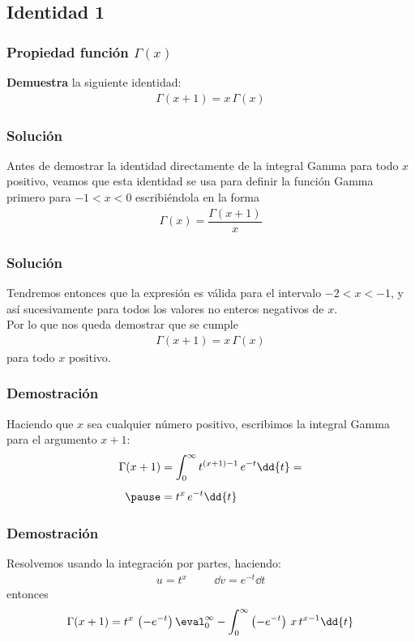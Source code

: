 \subsection{Identidad 1}
\begin{frame}
\frametitle{Propiedad función $\Gamma(x)$}
\textbf{Demuestra} la siguiente identidad:
\begin{align*}
\Gamma (x + 1) = x \, \Gamma (x)
\end{align*}
\end{frame}
\begin{frame}
\frametitle{Solución}
Antes de demostrar la identidad directamente de la integral Gamma para todo $x$ positivo, veamos que esta identidad se usa para definir la función Gamma primero para $-1 < x < 0$ escribiéndola en la forma 
\begin{align*}
\Gamma(x) = \dfrac{\Gamma (x + 1)}{x}
\end{align*}
\end{frame}
\begin{frame}
\frametitle{Solución}
Tendremos entonces que la expresión es válida para el intervalo $-2 < x < -1$, y así sucesivamente para todos los valores no enteros negativos de $x$.
\\
\bigskip
\pause
Por lo que nos queda demostrar que se cumple
\begin{align*}
\Gamma (x + 1) =  x \, \Gamma (x)
\end{align*}
para todo $x$ positivo.
\end{frame}
\begin{frame}
\frametitle{Demostración}
Haciendo que $x$ sea cualquier número positivo, escribimos la integral Gamma para el argumento $x + 1$:
\begin{eqnarray*}
\Gamma (x + 1) &= \displaystyle \int_{0}^{\infty} t^{(x+1)-1} \, e^{-t} \dd{t} = \\[0.5em] \pause
&= t^{x} \, e^{-t} \dd{t}
\end{eqnarray*}
\end{frame}
\begin{frame}
\frametitle{Demostración}
Resolvemos usando la integración por partes, haciendo:
\begin{align*}
u = t^{x} \hspace{1cm} \dd{v} = e^{-t} \dd{t}
\end{align*}
entonces
\pause
\begin{align*}
\Gamma (x + 1) = t^{x} \, \left( - e^{-t}\right)\eval_{0}^{\infty} - \int_{0}^{\infty} \left( -e^{-t}\right) \, x \, t^{x-1} \dd{t}
\end{align*}
\end{frame}
